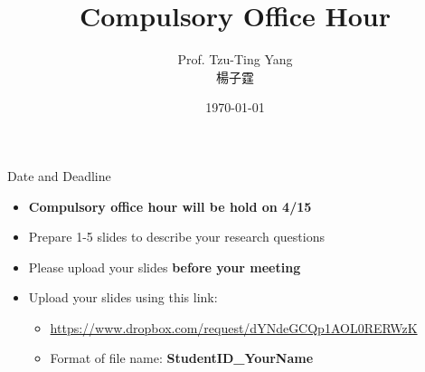 \documentclass[dvipsnames,hyperref={pdfpagelabels=false}]{beamer}
\title[]  
{Compulsory Office Hour}
\author 
{Prof. Tzu-Ting Yang  \\ 楊子霆}
\institute{Institute of Economics, Academia Sinica  \\ 中央研究院經濟研究所}
\date
{\today}
\begin{document}
\begin{frame}{}
 \titlepage
\end{frame}



\begin{frame}{Date and Deadline}
\begin{itemize} 
\item \textbf{Compulsory office hour will be hold on 4/15} 
\vspace{0.2cm}
\item Prepare 1-5 slides to describe your research questions 
\vspace{0.2cm}
\item Please upload your slides \textbf{before your meeting}
\vspace{0.2cm}
\item Upload your slides using this link:
\vspace{0.2cm}
\begin{itemize} 
\item \url{https://www.dropbox.com/request/dYNdeGCQp1AOL0RERWzK}
	\vspace{0.2cm}
\item Format of file name: \textbf{StudentID\_YourName}
\vspace{0.2cm}

\end{itemize}

\end{itemize}
\end{frame}
\end{document}
